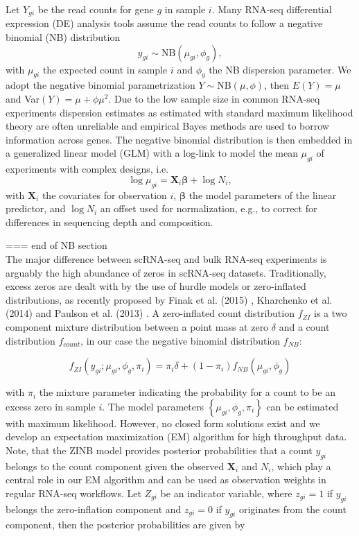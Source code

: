 \documentclass{bmcart}
\newcommand{\mb}[1]{\boldsymbol{\mathbf{#1}}}
\begin{document}
Let $Y_{gi}$ be the read counts for gene $g$ in sample $i$.
Many RNA-seq differential expression (DE) analysis tools \cite{Love2014, Anders2010, McCarthy2012} assume the read counts to follow a negative binomial (NB) distribution
\[ y_{gi} \sim \text{NB}(\mu_{gi},\phi_g), \]
with $\mu_{gi}$ the expected count in sample $i$ and $\phi_g$ the NB dispersion parameter.
We adopt the negative binomial parametrization $Y \sim \text{NB}(\mu,\phi)$, then $E(Y)=\mu$ and Var$(Y)= \mu + \phi\mu^2$.
Due to the low sample size in common RNA-seq experiments dispersion estimates as estimated with standard maximum likelihood theory are often unreliable and empirical Bayes methods \cite{Smyth2004,Efron2010} are used to borrow information across genes.
The negative binomial distribution is then embedded in a generalized linear model (GLM) with a log-link to model the mean $\mu_{gi}$  of experiments with complex designs, i.e.
\[\log{\mu_{gi}}= \mathbf{X}_i\boldsymbol{\beta}+\log N_i,\]
with $\mathbf{X}_i$ the covariates for observation $i$, $\boldsymbol{\beta}$ the model parameters of the linear predictor, and  $\log N_i$ an offset used for normalization, e.g., to correct for differences in sequencing depth and composition\cite{Robinson2010}. 

=== end of NB section\\

The major difference between scRNA-seq and bulk RNA-seq experiments is arguably the high abundance of zeros in scRNA-seq datasets. 
Traditionally, excess zeros are dealt with by the use of hurdle models or zero-inflated distributions, as recently proposed by Finak et al. (2015) \cite{Finak2015}, Kharchenko et al. (2014) \cite{Kharchenko2014} and Paulson et al. (2013) \cite{Paulson2013}. 
A zero-inflated count distribution $f_{ZI}$ is a two component mixture distribution between a point mass at zero $\delta$ and a count distribution $f_{count}$, in our case the negative binomial distribution $f_{NB}$:

\[ f_{ZI}(y_{gi}; \mu_{gi}, \phi_g, \pi_i) = \pi_i\delta + (1-\pi_i)f_{NB}(\mu_{gi},\phi_g) \]

with $\pi_i$ the mixture parameter indicating the probability for a count to be an excess zero in sample $i$.
The model parameters $\left\{\mu_{gi}, \phi_g, \pi_i\right\}$ can be estimated with maximum likelihood.
However, no closed form solutions exist and we develop an expectation maximization (EM) algorithm for high throughput data.
Note, that the ZINB model provides posterior probabilities that a count $y_{gi}$ belongs to the count component given the observed $\mb{X}_i$ and $N_i$, which play a central role in our EM algorithm and can be used as observation weights in regular RNA-seq workflows. Let $Z_{gi}$ be an indicator variable, where $z_{gi}=1$ if $y_{gi}$ belongs the zero-inflation component and $z_{gi}=0$ if $y_{gi}$ originates from the count component, then the posterior probabilities are given by
\end{document}
